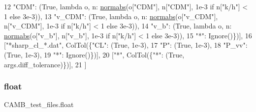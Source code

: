 \begin{DoxyCode}
12                                                \textcolor{stringliteral}{"CDM"}: (\textcolor{keyword}{True}, \textcolor{keyword}{lambda} o, n: 
      \mbox{\hyperlink{namespaceCAMB__test__files_a942fd27486efa4cad8f9592101d8d6b4}{normabs}}(o[\textcolor{stringliteral}{"CDM"}], n[\textcolor{stringliteral}{"CDM"}], 1e-3 \textcolor{keywordflow}{if} n[\textcolor{stringliteral}{"k/h"}] < 1 \textcolor{keywordflow}{else} 3e-3)),
13                                                \textcolor{stringliteral}{"v\_CDM"}: (\textcolor{keyword}{True}, \textcolor{keyword}{lambda} o, n: 
      \mbox{\hyperlink{namespaceCAMB__test__files_a942fd27486efa4cad8f9592101d8d6b4}{normabs}}(o[\textcolor{stringliteral}{"v\_CDM"}], n[\textcolor{stringliteral}{"v\_CDM"}], 1e-3 \textcolor{keywordflow}{if} n[\textcolor{stringliteral}{"k/h"}] < 1 \textcolor{keywordflow}{else} 3e-3)),
14                                                \textcolor{stringliteral}{"v\_b"}: (\textcolor{keyword}{True}, \textcolor{keyword}{lambda} o, n: 
      \mbox{\hyperlink{namespaceCAMB__test__files_a942fd27486efa4cad8f9592101d8d6b4}{normabs}}(o[\textcolor{stringliteral}{"v\_b"}], n[\textcolor{stringliteral}{"v\_b"}], 1e-3 \textcolor{keywordflow}{if} n[\textcolor{stringliteral}{"k/h"}] < 1 \textcolor{keywordflow}{else} 3e-3)),
15                                                \textcolor{stringliteral}{"*"}: Ignore()\})],
16                  [\textcolor{stringliteral}{"*sharp\_cl\_*.dat"}, ColTol(\{\textcolor{stringliteral}{"CL"}: (\textcolor{keyword}{True}, 1e-3),
17                                              \textcolor{stringliteral}{"P"}: (\textcolor{keyword}{True}, 1e-3),
18                                              \textcolor{stringliteral}{"P\_vv"}: (\textcolor{keyword}{True}, 1e-3),
19                                              \textcolor{stringliteral}{"*"}: Ignore()\})],
20                  [\textcolor{stringliteral}{"*"}, ColTol(\{\textcolor{stringliteral}{"*"}: (\textcolor{keyword}{True}, args.diff\_tolerance)\})],
21                 ]
\end{DoxyCode}
\mbox{\label{namespaceCAMB__test__files_ae415889d382c2b3dee8dea1dd987ebb0}} 
\subsubsection{\texorpdfstring{float}{float}}
{\footnotesize\ttfamily C\+A\+M\+B\+\_\+test\+\_\+files.\+float}



